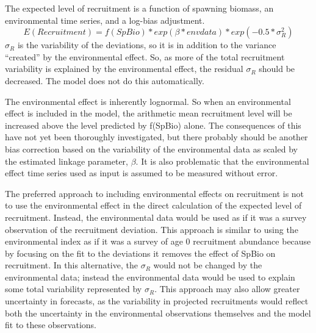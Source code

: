 The expected level of recruitment is a function of spawning biomass, an environmental time series, and a log-bias adjustment.
\begin{equation}
	E(Recruitment) = f(SpBio) * exp(\beta*envdata) * exp(-0.5*\sigma_R^2)
\end{equation}
$\sigma_R$ is the variability of the deviations, so it is in addition to the variance ``created'' by the environmental effect.  So, as more of the total recruitment variability is explained by the environmental effect, the residual $\sigma_R$ should be decreased.  The model does not do this automatically.

The environmental effect is inherently lognormal.  So when an environmental effect is included in the model, the arithmetic mean recruitment level will be increased above the level predicted by f(SpBio) alone.  The consequences of this have not yet been thoroughly investigated, but there probably should be another bias correction based on the variability of the environmental data as scaled by the estimated linkage parameter, $\beta$.  It is also problematic that the environmental effect time series used as input is assumed to be measured without error.

The preferred approach to including environmental effects on recruitment is not to use the environmental effect in the direct calculation of the expected level of recruitment.  Instead, the environmental data would be used as if it was a survey observation of the recruitment deviation.  This approach is similar to using the environmental index as if it was a survey of age 0 recruitment abundance because by focusing on the fit to the deviations it removes the effect of SpBio on recruitment.  In this alternative, the $\sigma_R$ would not be changed by the environmental data; instead the environmental data would be used to explain some total variability represented by $\sigma_R$.  This approach may also allow greater uncertainty in forecasts, as the variability in projected recruitments would reflect both the uncertainty in the environmental observations themselves and the model fit to these observations.

